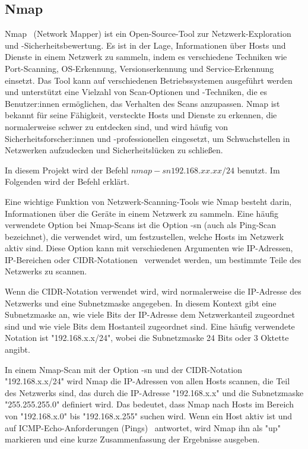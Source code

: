 \documentclass[12pt]{article}
\begin{document}
\subsection*{Nmap}

Nmap~\cite{NMAP} (Network Mapper) ist ein Open-Source-Tool zur Netzwerk-Exploration und -Sicherheitsbewertung. Es ist in der Lage, Informationen über Hosts und Dienste in einem Netzwerk zu sammeln, indem es verschiedene Techniken wie Port-Scanning, OS-Erkennung, Versionserkennung und Service-Erkennung einsetzt. Das Tool kann auf verschiedenen Betriebssystemen ausgeführt werden und unterstützt eine Vielzahl von Scan-Optionen und -Techniken, die es Benutzer:innen ermöglichen, das Verhalten des Scans anzupassen. Nmap ist bekannt für seine Fähigkeit, versteckte Hosts und Dienste zu erkennen, die normalerweise schwer zu entdecken sind, und wird häufig von Sicherheitsforscher:innen und -professionellen eingesetzt, um Schwachstellen in Netzwerken aufzudecken und Sicherheitslücken zu schließen.

In diesem Projekt wird der Befehl $nmap -sn 192.168.xx.xx/24$ benutzt. Im Folgenden wird der Befehl erklärt.


Eine wichtige Funktion von Netzwerk-Scanning-Tools wie Nmap besteht darin, Informationen über die Geräte in einem Netzwerk zu sammeln. Eine häufig verwendete Option bei Nmap-Scans ist die Option -sn (auch als Ping-Scan bezeichnet), die verwendet wird, um festzustellen, welche Hosts im Netzwerk aktiv sind. Diese Option kann mit verschiedenen Argumenten wie IP-Adressen, IP-Bereichen oder CIDR-Notationen~\cite{CIDR} verwendet werden, um bestimmte Teile des Netzwerks zu scannen.

Wenn die CIDR-Notation verwendet wird, wird normalerweise die IP-Adresse des Netzwerks und eine Subnetzmaske angegeben. In diesem Kontext gibt eine Subnetzmaske an, wie viele Bits der IP-Adresse dem Netzwerkanteil zugeordnet sind und wie viele Bits dem Hostanteil zugeordnet sind. Eine häufig verwendete Notation ist "192.168.x.x/24", wobei die Subnetzmaske 24 Bits oder 3 Oktette angibt.

In einem Nmap-Scan mit der Option -sn und der CIDR-Notation "192.168.x.x/24" wird Nmap die IP-Adressen von allen Hosts scannen, die Teil des Netzwerks sind, das durch die IP-Adresse "192.168.x.x" und die Subnetzmaske "255.255.255.0" definiert wird. Das bedeutet, dass Nmap nach Hosts im Bereich von "192.168.x.0" bis "192.168.x.255" suchen wird. Wenn ein Host aktiv ist und auf ICMP-Echo-Anforderungen (Pings)~\cite{ICMP} antwortet, wird Nmap ihn als "up" markieren und eine kurze Zusammenfassung der Ergebnisse ausgeben.
\end{document}
